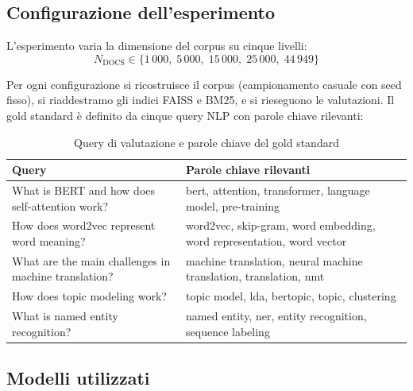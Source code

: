 \documentclass[12pt,a4paper]{article}
\begin{document}
\subsection{Configurazione dell'esperimento}

L'esperimento varia la dimensione del corpus su cinque livelli:
\[
  N_{\text{DOCS}} \in \{1\,000,\; 5\,000,\; 15\,000,\; 25\,000,\; 44\,949\}
\]

Per ogni configurazione si ricostruisce il corpus (campionamento casuale con seed fisso), si riaddestramo gli indici FAISS e BM25, e si rieseguono le valutazioni. Il gold standard \`e definito da cinque query NLP con parole chiave rilevanti:

\begin{table}[H]
  \centering
  \caption{Query di valutazione e parole chiave del gold standard}
  \begin{tabular}{p{7cm} p{7cm}}
    \toprule
    \textbf{Query} & \textbf{Parole chiave rilevanti} \\
    \midrule
    What is BERT and how does self-attention work? & bert, attention, transformer, language model, pre-training \\
    How does word2vec represent word meaning?       & word2vec, skip-gram, word embedding, word representation, word vector \\
    What are the main challenges in machine translation? & machine translation, neural machine translation, translation, nmt \\
    How does topic modeling work?                  & topic model, lda, bertopic, topic, clustering \\
    What is named entity recognition?              & named entity, ner, entity recognition, sequence labeling \\
    \bottomrule
  \end{tabular}
\end{table}

\subsection{Modelli utilizzati}
\end{document}
